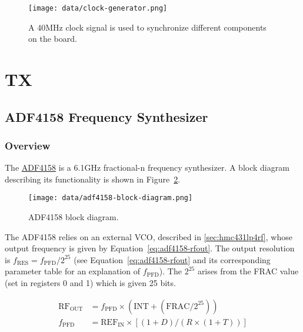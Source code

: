 \documentclass{default}
\begin{document}
\begin{figure}[h]
  \centering
  \texttt{[image: data/clock-generator.png]}
  \caption{A 40MHz clock signal is used to synchronize different components on the board.}
  \label{fig:clock-generator}
\end{figure}

\section{TX}



\subsection{ADF4158 Frequency Synthesizer}
\label{sec:adf4158-freq-synth}

\subsubsection{Overview}
\label{sec:adf4158-overview}

The \href{http://www.analog.com/media/en/technical-documentation/data-sheets/ADF4158.pdf}{ADF4158}
is a 6.1GHz fractional-n frequency synthesizer. A block diagram describing its functionality is shown in
Figure~\ref{fig:adf4158-block-diagram}.

\begin{figure}[h]
  \centering
  \texttt{[image: data/adf4158-block-diagram.png]}
  \caption{ADF4158 block diagram.}
  \label{fig:adf4158-block-diagram}
\end{figure}

The ADF4158 relies on an external VCO, described in \cref{sec:hmc431lp4rf}, whose output frequency
is given by Equation~\ref{eq:adf4158-rfout}. The output resolution is
$f_{\text{RES}} = f_{\text{PFD}}/2^{25}$ (see Equation~\ref{eq:adf4158-rfout} and its corresponding
parameter table for an explanation of $f_{\text{PFD}}$). The $2^{25}$ arises from the FRAC value
(set in registers 0 and 1) which is given 25 bits.

\begin{align}
  \text{RF}_{\text{OUT}} &= f_{\text{PFD}} \times \left(\text{INT} +
                           \left(\text{FRAC}/2^{25}\right)\right) \label{eq:adf4158-rfout} \\
  f_{\text{PFD}} &= \text{REF}_{\text{IN}} \times \left[\left(1 + D\right)/\left(R\times \left(1 +
                   T\right)\right) \right] \nonumber
\end{align}
\end{document}
